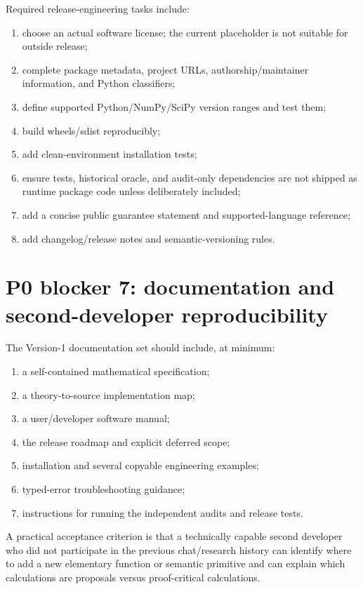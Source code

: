 \documentclass[11pt]{article}
\begin{document}
Required release-engineering tasks include:
\begin{enumerate}[leftmargin=*]
\item choose an actual software license; the current placeholder is not suitable
for outside release;
\item complete package metadata, project URLs, authorship/maintainer information,
and Python classifiers;
\item define supported Python/NumPy/SciPy version ranges and test them;
\item build wheels/sdist reproducibly;
\item add clean-environment installation tests;
\item ensure tests, historical oracle, and audit-only dependencies are not shipped
as runtime package code unless deliberately included;
\item add a concise public guarantee statement and supported-language reference;
\item add changelog/release notes and semantic-versioning rules.
\end{enumerate}

\section{P0 blocker 7: documentation and second-developer reproducibility}

The Version-1 documentation set should include, at minimum:
\begin{enumerate}[leftmargin=*]
\item a self-contained mathematical specification;
\item a theory-to-source implementation map;
\item a user/developer software manual;
\item the release roadmap and explicit deferred scope;
\item installation and several copyable engineering examples;
\item typed-error troubleshooting guidance;
\item instructions for running the independent audits and release tests.
\end{enumerate}

A practical acceptance criterion is that a technically capable second developer
who did not participate in the previous chat/research history can identify where
to add a new elementary function or semantic primitive and can explain which
calculations are proposals versus proof-critical calculations.
\end{document}
